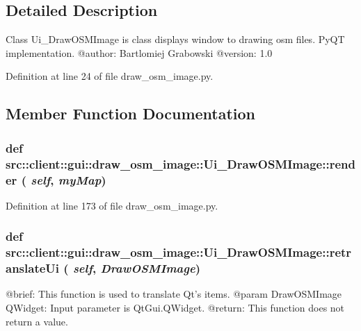 \subsection{Detailed Description}
\begin{DoxyVerb}
Class Ui_DrawOSMImage is class displays window to drawing osm files. PyQT implementation.
@author: Bartlomiej Grabowski
@version: 1.0
\end{DoxyVerb}
 

Definition at line 24 of file draw\_\-osm\_\-image.py.



\subsection{Member Function Documentation}
\hypertarget{classsrc_1_1client_1_1gui_1_1draw__osm__image_1_1Ui__DrawOSMImage_aa655d6c8e314c6540f905ad83ea0c071}{
\subsubsection[{render}]{\setlength{\rightskip}{0pt plus 5cm}def src::client::gui::draw\_\-osm\_\-image::Ui\_\-DrawOSMImage::render ( {\em self}, \/   {\em myMap})}}
\label{classsrc_1_1client_1_1gui_1_1draw__osm__image_1_1Ui__DrawOSMImage_aa655d6c8e314c6540f905ad83ea0c071}


Definition at line 173 of file draw\_\-osm\_\-image.py.

\hypertarget{classsrc_1_1client_1_1gui_1_1draw__osm__image_1_1Ui__DrawOSMImage_a356b205b95ed1acc319b4c65ad75ad12}{
\subsubsection[{retranslateUi}]{\setlength{\rightskip}{0pt plus 5cm}def src::client::gui::draw\_\-osm\_\-image::Ui\_\-DrawOSMImage::retranslateUi ( {\em self}, \/   {\em DrawOSMImage})}}
\label{classsrc_1_1client_1_1gui_1_1draw__osm__image_1_1Ui__DrawOSMImage_a356b205b95ed1acc319b4c65ad75ad12}
\begin{DoxyVerb}
@brief: This function is used to translate Qt's items.
@param DrawOSMImage QWidget: Input parameter is QtGui.QWidget.
@return: This function does not return a value.
\end{DoxyVerb}
 

